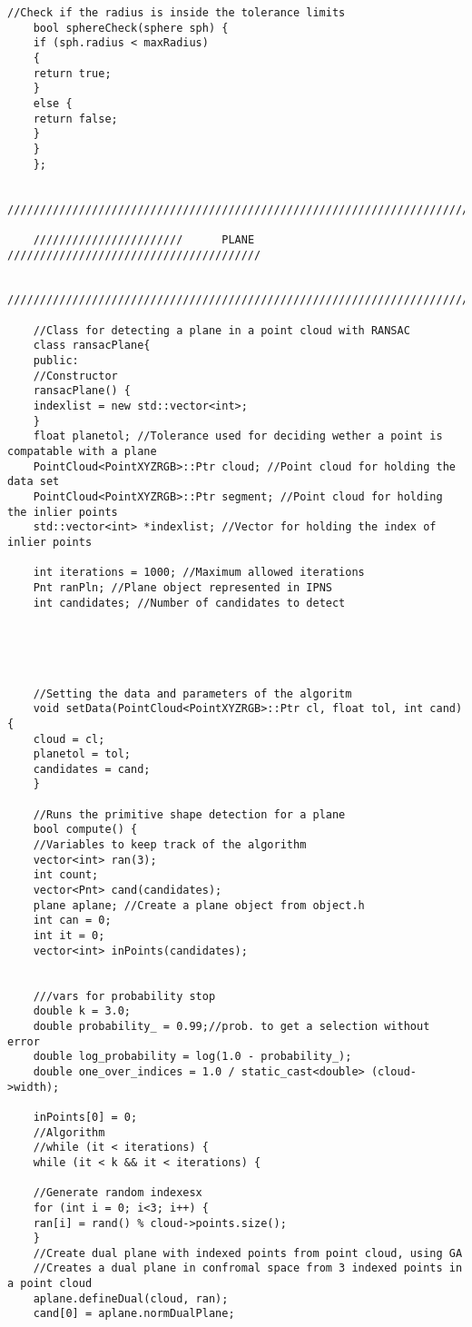 {\begin{lstlisting}[caption={Archivo ransac.h}]
	//Check if the radius is inside the tolerance limits
	bool sphereCheck(sphere sph) {
	if (sph.radius < maxRadius)
	{
	return true;
	}
	else {
	return false;
	}
	}
	};
	
	//////////////////////////////////////////////////////////////////////////////
	
	///////////////////////      PLANE     ///////////////////////////////////////
	
	//////////////////////////////////////////////////////////////////////////////
	
	//Class for detecting a plane in a point cloud with RANSAC
	class ransacPlane{
	public:
	//Constructor
	ransacPlane() {
	indexlist = new std::vector<int>;
	}
	float planetol; //Tolerance used for deciding wether a point is compatable with a plane
	PointCloud<PointXYZRGB>::Ptr cloud; //Point cloud for holding the data set
	PointCloud<PointXYZRGB>::Ptr segment; //Point cloud for holding the inlier points
	std::vector<int> *indexlist; //Vector for holding the index of inlier points
	
	int iterations = 1000; //Maximum allowed iterations
	Pnt ranPln; //Plane object represented in IPNS 
	int candidates; //Number of candidates to detect
	
	
	
	
	
	//Setting the data and parameters of the algoritm
	void setData(PointCloud<PointXYZRGB>::Ptr cl, float tol, int cand) {
	cloud = cl;
	planetol = tol;
	candidates = cand;
	}
	
	//Runs the primitive shape detection for a plane
	bool compute() {
	//Variables to keep track of the algorithm
	vector<int> ran(3);
	int count;
	vector<Pnt> cand(candidates);
	plane aplane; //Create a plane object from object.h
	int can = 0;
	int it = 0;
	vector<int> inPoints(candidates);
	
	
	///vars for probability stop
	double k = 3.0;
	double probability_ = 0.99;//prob. to get a selection without error
	double log_probability = log(1.0 - probability_);
	double one_over_indices = 1.0 / static_cast<double> (cloud->width);
	
	inPoints[0] = 0;
	//Algorithm
	//while (it < iterations) {
	while (it < k && it < iterations) {
	
	//Generate random indexesx
	for (int i = 0; i<3; i++) {
	ran[i] = rand() % cloud->points.size();
	}
	//Create dual plane with indexed points from point cloud, using GA
	//Creates a dual plane in confromal space from 3 indexed points in a point cloud
	aplane.defineDual(cloud, ran); 
	cand[0] = aplane.normDualPlane;
	

\end{lstlisting}}
